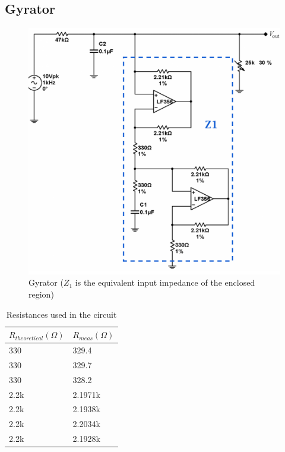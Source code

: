 \documentclass{article}
\begin{document}
    \subsection{Gyrator}
    \begin{figure}[H]
        \centering
        \includegraphics[scale = 0.6]{2.png}
        \caption{Gyrator \cite{lab7} ($Z_1$ is the equivalent input impedance of the enclosed region)}
        \label{fig:my_label}
    \end{figure}
    \begin{table}[H]
        \centering
        \caption{Resistances used in the circuit}
        \label{my-label}
        \begin{tabular}{ll}
        \textbf{$R_{theoretical} (\Omega)$} & \textbf{$R_{meas} (\Omega)$} \\ \hline
        330 & 329.4 \\
        330 & 329.7 \\
        330 & 328.2 \\
        2.2k & 2.1971k \\
        2.2k & 2.1938k \\
        2.2k & 2.2034k \\
        2.2k & 2.1928k
        \end{tabular}
        \end{table}
\end{document}
